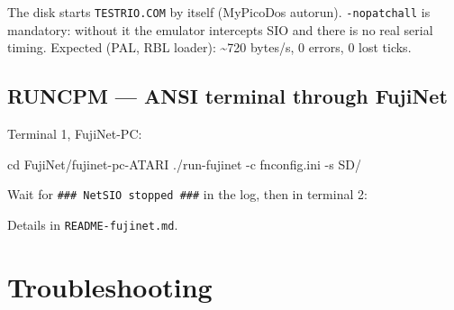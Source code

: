 \documentclass[
]{article}
\newenvironment{Shaded}{}{}
\newcommand{\AttributeTok}[1]{\textcolor[rgb]{0.49,0.56,0.16}{#1}}
\newcommand{\BuiltInTok}[1]{\textcolor[rgb]{0.00,0.50,0.00}{#1}}
\newcommand{\DataTypeTok}[1]{\textcolor[rgb]{0.56,0.13,0.00}{#1}}
\newcommand{\ExtensionTok}[1]{#1}
\newcommand{\FunctionTok}[1]{\textcolor[rgb]{0.02,0.16,0.49}{#1}}
\newcommand{\NormalTok}[1]{#1}
\newcommand{\VariableTok}[1]{\textcolor[rgb]{0.10,0.09,0.49}{#1}}
\begin{document}
\begin{Shaded}
\end{Shaded}

The disk starts \texttt{TESTRIO.COM} by itself (MyPicoDos autorun).
\texttt{-nopatchall} is mandatory: without it the emulator intercepts
SIO and there is no real serial timing. Expected (PAL, RBL loader):
\textasciitilde720 bytes/s, 0 errors, 0 lost ticks.

\subsection{RUNCPM --- ANSI terminal through
FujiNet}\label{runcpm-ansi-terminal-through-fujinet}

Terminal 1, FujiNet-PC:

\begin{Shaded}
\begin{Highlighting}[]
\BuiltInTok{cd}\NormalTok{ FujiNet/fujinet{-}pc{-}ATARI}
\ExtensionTok{./run{-}fujinet} \AttributeTok{{-}c}\NormalTok{ fnconfig.ini }\AttributeTok{{-}s}\NormalTok{ SD/}
\end{Highlighting}
\end{Shaded}

Wait for \texttt{\#\#\#\ NetSIO\ stopped\ \#\#\#} in the log, then in
terminal 2:

\begin{Shaded}
\end{Shaded}

Details in \texttt{README-fujinet.md}.

\section{Troubleshooting}\label{troubleshooting}
\end{document}
